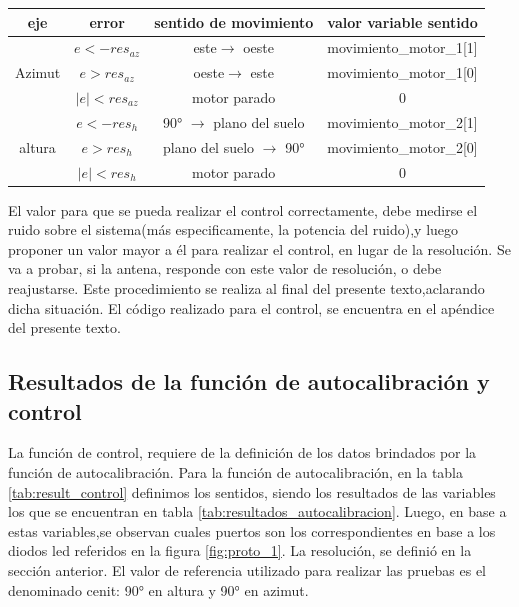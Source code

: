  \begin{table}[ht]
 	\centering 
 	\begin{tabular}{|c|c|c|c|}
 		\hline 
 		eje & error & sentido de movimiento & valor variable sentido \\ 
 		\hline	 
 		\multirow{3}{*}{Azimut}& $e<-res_{az}$ & este$\rightarrow$ oeste  &movimiento\_motor\_1[1] \\ \cline{2-4}
 		& $e>res_{az}$& oeste$\rightarrow$ este& movimiento\_motor\_1[0] \\ \cline{2-4}
 		& $|e|<res_{az}$& motor parado & 0\\ \cline{2-4}
 		\hline   
 		\multirow{3}{*}{altura}& $e<-res_h $ &90° $\rightarrow$ plano del suelo& movimiento\_motor\_2[1] \\ \cline{2-4}
 		& $e>res_h$ &plano del suelo $\rightarrow$ 90° & movimiento\_motor\_2[0] \\ \cline{2-4}
 		& $|e|<res_h$& motor parado& 0\\ 
 		\hline
 		  			
  	\end{tabular}
 \end{table}  
 
 El valor para que se pueda realizar el control correctamente, debe medirse el ruido sobre el sistema(más especificamente, la potencia del ruido),y luego proponer un valor mayor a él para realizar el control, en lugar de la resolución. Se va a probar, si la antena, responde con este valor de resolución, o debe reajustarse. Este procedimiento se realiza al final del presente texto,aclarando dicha situación. El código realizado para el control, se encuentra en el apéndice del presente texto. 

\subsection{Resultados de la función de autocalibración y control}

La función de control, requiere de la definición de los datos brindados por la función de autocalibración. Para la función de autocalibración, en la tabla \ref{tab:result_control} definimos los sentidos, siendo los resultados de las variables los que se encuentran en tabla \ref{tab:resultados_autocalibracion}. Luego, en base a estas variables,se observan cuales puertos son los correspondientes en base a los diodos led referidos en la figura \ref{fig:proto_1}. La resolución, se definió en la sección anterior. El valor de referencia utilizado para realizar las pruebas es el denominado cenit: 90° en altura y 90° en azimut. 

